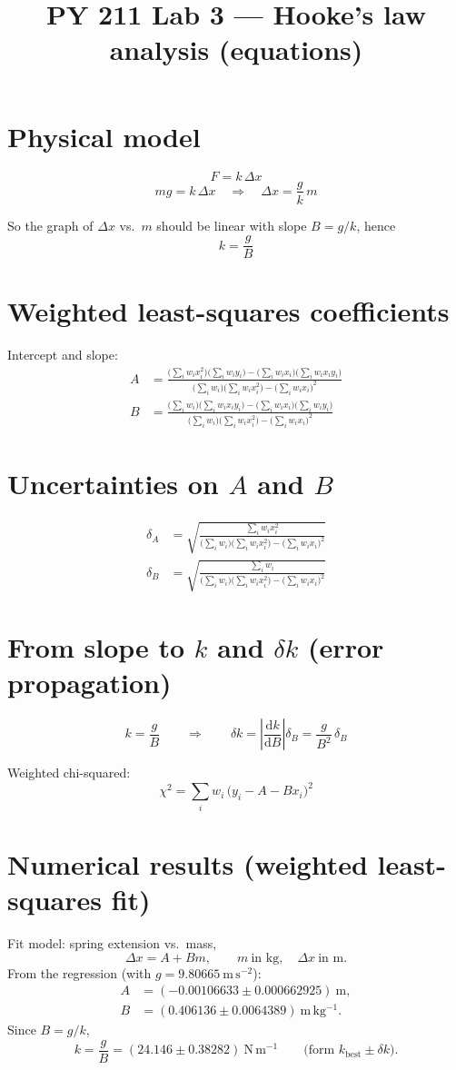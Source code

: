 \documentclass{report}
\title{PY 211 Lab 3 --- Hooke's law analysis (equations)}
\author{}
\date{}
\begin{document}
\section*{Physical model}
$$
  F = k\,\Delta x
$$
$$
  mg = k\,\Delta x
  \quad\Rightarrow\quad
  \Delta x = \frac{g}{k}\,m
$$

So the graph of $\Delta x$ vs.\ $m$ should be linear with slope $B = g/k$, hence
$$
  k = \frac{g}{B}
$$

\section*{Weighted least-squares coefficients}
Intercept and slope:
\begin{align}
  A &= \frac{\bigl(\sum_i w_i x_i^2\bigr)\bigl(\sum_i w_i y_i\bigr) - \bigl(\sum_i w_i x_i\bigr)\bigl(\sum_i w_i x_i y_i\bigr)}{\bigl(\sum_i w_i\bigr)\bigl(\sum_i w_i x_i^2\bigr) - \bigl(\sum_i w_i x_i\bigr)^2} \\
  B &= \frac{\bigl(\sum_i w_i\bigr)\bigl(\sum_i w_i x_i y_i\bigr) - \bigl(\sum_i w_i x_i\bigr)\bigl(\sum_i w_i y_i\bigr)}{\bigl(\sum_i w_i\bigr)\bigl(\sum_i w_i x_i^2\bigr) - \bigl(\sum_i w_i x_i\bigr)^2}
\end{align}

\section*{Uncertainties on $A$ and $B$}
\begin{align}
  \delta_A &= \sqrt{\frac{\sum_i w_i x_i^2}{\bigl(\sum_i w_i\bigr)\bigl(\sum_i w_i x_i^2\bigr) - \bigl(\sum_i w_i x_i\bigr)^2}} \\
  \delta_B &= \sqrt{\frac{\sum_i w_i}{\bigl(\sum_i w_i\bigr)\bigl(\sum_i w_i x_i^2\bigr) - \bigl(\sum_i w_i x_i\bigr)^2}}
\end{align}

\section*{From slope to $k$ and $\delta k$ (error propagation)}
$$
  k = \frac{g}{B}
  \qquad\Rightarrow\qquad
  \delta k = \left|\frac{\mathrm{d}k}{\mathrm{d}B}\right|\delta_B = \frac{g}{B^2}\,\delta_B
$$

Weighted chi-squared:
\begin{equation}
  \chi^2 = \sum_i w_i\,\bigl(y_i - A - Bx_i\bigr)^2
\end{equation}

\section*{Numerical results (weighted least-squares fit)}
Fit model: spring extension vs.\ mass,
$$
  \Delta x = A + B m,
  \qquad m\ \text{in kg},\quad \Delta x\ \text{in m}.
$$
From the regression (with $g = 9.80665\ \mathrm{m\,s^{-2}}$):
\begin{align*}
  A &= (-0.00106633 \pm 0.000662925)\ \mathrm{m}, \\
  B &= (0.406136 \pm 0.0064389)\ \mathrm{m\,kg^{-1}}.
\end{align*}
Since $B = g/k$,
$$
  k = \frac{g}{B} = (24.146 \pm 0.38282)\ \mathrm{N\,m^{-1}}
  \qquad\text{(form } k_{\mathrm{best}} \pm \delta k\text{)}.
$$
\end{document}

